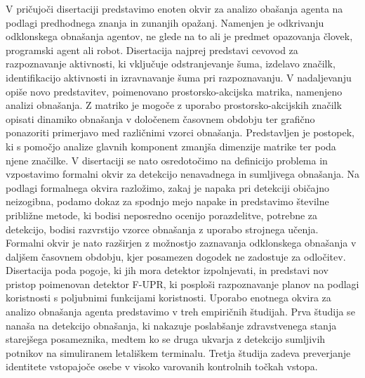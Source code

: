 V pri{\v c}ujo{\v c}i disertaciji predstavimo enoten okvir za analizo oba{\v s}anja agenta na podlagi predhodnega znanja in zunanjih opa{\v z}anj. Namenjen je odkrivanju odklonskega obna{\v s}anja agentov, ne glede na to ali je predmet opazovanja {\v c}lovek, programski agent ali robot. Disertacija najprej predstavi cevovod za razpoznavanje aktivnosti, ki vklju{\v c}uje odstranjevanje {\v s}uma, izdelavo zna{\v c}ilk, identifikacijo aktivnosti in izravnavanje {\v s}uma pri razpoznavanju. V nadaljevanju opi{\v s}e novo predstavitev, poimenovano prostorsko-akcijska matrika, namenjeno analizi obna{\v s}anja. Z matriko je mogo{\v c}e z uporabo prostorsko-akcijskih zna{\v c}ilk opisati dinamiko obna{\v s}anja v dolo{\v c}enem {\v c}asovnem obdobju ter grafi{\v c}no ponazoriti primerjavo med razli{\v c}nimi vzorci obna{\v s}anja. Predstavljen je postopek, ki s pomo{\v c}jo analize glavnih komponent zmanj{\v s}a dimenzije matrike ter poda njene zna{\v c}ilke. V disertaciji se nato osredoto{\v c}imo na definicijo problema in vzpostavimo formalni okvir za detekcijo nenavadnega in sumljivega obna{\v s}anja. Na podlagi formalnega okvira razlo{\v z}imo, zakaj je napaka pri detekciji obi{\v c}ajno neizogibna, podamo dokaz za spodnjo mejo napake in predstavimo {\v s}tevilne pribli{\v z}ne metode, ki bodisi neposredno ocenijo porazdelitve, potrebne za detekcijo, bodisi razvrstijo vzorce obna{\v s}anja z uporabo strojnega u{\v c}enja. Formalni okvir je nato raz{\v s}irjen z mo{\v z}nostjo zaznavanja odklonskega obna{\v s}anja v dalj{\v s}em {\v c}asovnem obdobju, kjer posamezen dogodek ne zadostuje za odlo{\v c}itev. Disertacija poda pogoje, ki jih mora detektor izpolnjevati, in predstavi nov pristop poimenovan detektor F-UPR, ki posplo{\v s}i razpoznavanje planov na podlagi koristnosti s poljubnimi funkcijami koristnosti. Uporabo enotnega okvira za analizo obna{\v s}anja agenta predstavimo v treh empiri{\v c}nih {\v s}tudijah. Prva {\v s}tudija se nana{\v s}a na detekcijo obna{\v s}anja, ki nakazuje poslab{\v s}anje zdravstvenega stanja starej{\v s}ega posameznika, medtem ko se druga ukvarja z detekcijo sumljivih potnikov na simuliranem letali{\v s}kem terminalu. Tretja {\v s}tudija zadeva preverjanje identitete vstopajo{\v c}e osebe v visoko varovanih kontrolnih to{\v c}kah vstopa.

